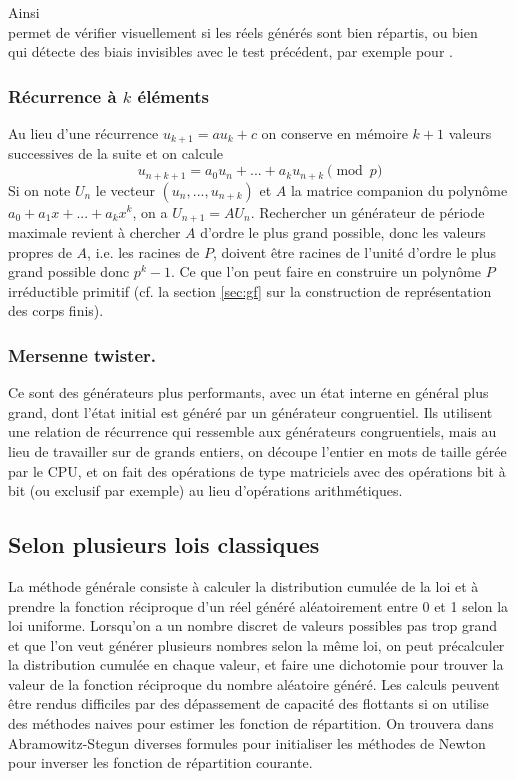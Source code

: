 \documentclass[a4paper,11pt]{article}
\begin{document}
\begin{giacjshere}
Ainsi \\
permet de v\'erifier visuellement si les r\'eels g\'en\'er\'es sont
bien r\'epartis, ou bien\\
qui d\'etecte des biais invisibles avec le test pr\'ec\'edent, par
exemple pour 
.

\subsubsection{R\'ecurrence \`a $k$ \'el\'ements}
Au lieu d'une r\'ecurrence $u_{k+1}=au_k+c$ on conserve en m\'emoire
$k+1$ valeurs successives de la suite et on calcule
$$ u_{n+k+1} = a_0 u_n+...+a_{k}u_{n+k} \pmod p$$
Si on note $U_n$ le vecteur $(u_n,...,u_{n+k})$ et $A$
la matrice companion du polyn\^ome $a_0+a_1x+...+a_kx^k$,
on a $U_{n+1}=AU_n$. Rechercher un g\'en\'erateur de p\'eriode
maximale revient \`a chercher $A$ d'ordre le plus grand possible, donc
les valeurs propres de $A$, i.e. les racines de $P$, doivent \^etre
racines de l'unit\'e d'ordre le plus grand possible donc $p^k-1$. 
Ce que l'on peut faire en construire un polyn\^ome $P$ irr\'eductible
primitif (cf. la section \ref{sec:gf} sur la construction de repr\'esentation
des corps finis).

\subsubsection{Mersenne twister.}
Ce sont des générateurs plus performants, avec un état interne
en général plus grand, dont l'état initial est généré par
un générateur congruentiel. Ils utilisent une relation
de r\'ecurrence qui ressemble aux g\'en\'erateurs
congruentiels, mais au lieu de travailler sur de grands
entiers, on d\'ecoupe l'entier en mots de taille g\'er\'ee
par le CPU, et on fait des op\'erations de type matriciels
avec des op\'erations bit \`a bit (ou exclusif par exemple)
au lieu d'op\'erations arithm\'etiques.

\subsection{Selon plusieurs lois classiques}
La m\'ethode g\'en\'erale consiste \`a calculer la distribution
cumul\'ee de la loi et \`a prendre la fonction r\'eciproque
d'un r\'eel g\'en\'er\'e al\'eatoirement entre 0 et 1 selon
la loi uniforme. Lorsqu'on a un nombre discret de valeurs possibles
pas trop grand et que l'on veut g\'en\'erer plusieurs
nombres selon la m\^eme loi, on peut pr\'ecalculer la distribution cumul\'ee
en chaque valeur, et faire une dichotomie pour trouver
la valeur de la fonction r\'eciproque du nombre al\'eatoire
g\'en\'er\'e. Les calculs peuvent être rendus difficiles
par des dépassement de capacité des flottants si on utilise
des méthodes naives pour estimer les fonction de répartition.
On trouvera dans Abramowitz-Stegun diverses formules 
pour initialiser les méthodes de Newton pour inverser les
fonction de répartition courante.


\end{giacjshere}
\end{document}
